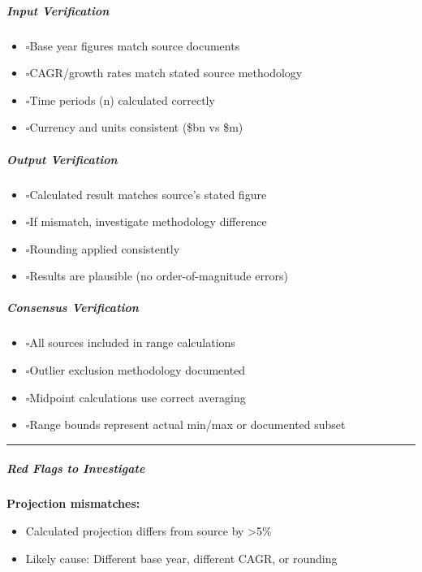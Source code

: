 \documentclass[11pt]{article}
\newcommand{\UncheckedBox}{$\square$}
\begin{document}
\subparagraph{Input Verification}\mbox{}\par
\begin{itemize}[leftmargin=*,itemsep=2pt,topsep=2pt]
\item {} \UncheckedBox Base year figures match source documents
\item {} \UncheckedBox CAGR/growth rates match stated source methodology
\item {} \UncheckedBox Time periods (n) calculated correctly
\item {} \UncheckedBox Currency and units consistent (\$bn vs \$m)
\end{itemize}

\subparagraph{Output Verification}\mbox{}\par
\begin{itemize}[leftmargin=*,itemsep=2pt,topsep=2pt]
\item {} \UncheckedBox Calculated result matches source's stated figure
\item {} \UncheckedBox If mismatch, investigate methodology difference
\item {} \UncheckedBox Rounding applied consistently
\item {} \UncheckedBox Results are plausible (no order-of-magnitude errors)
\end{itemize}

\subparagraph{Consensus Verification}\mbox{}\par
\begin{itemize}[leftmargin=*,itemsep=2pt,topsep=2pt]
\item {} \UncheckedBox All sources included in range calculations
\item {} \UncheckedBox Outlier exclusion methodology documented
\item {} \UncheckedBox Midpoint calculations use correct averaging
\item {} \UncheckedBox Range bounds represent actual min/max or documented subset
\end{itemize}

\vspace{0.5em}\hrule\vspace{0.5em}

\subparagraph{Red Flags to Investigate}\mbox{}\par

\textbf{Projection mismatches:}

\begin{itemize}[leftmargin=*,itemsep=2pt,topsep=2pt]
\item {} Calculated projection differs from source by >5\%
\item {} Likely cause: Different base year, different CAGR, or rounding
\end{itemize}
\end{document}

